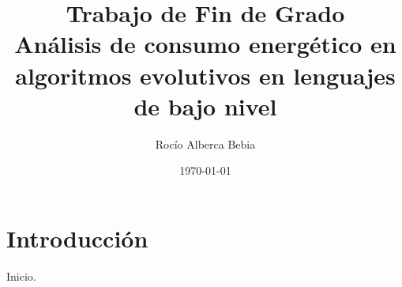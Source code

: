 \documentclass[a4paper,12pt]{book}
\begin{document}
\title{Trabajo de Fin de Grado \\ \large Análisis de consumo energético en algoritmos evolutivos en lenguajes de bajo nivel}
\author{Rocío Alberca Bebia}
\date{\today}
\maketitle

\chapter{Introducción}
Inicio.
\end{document}

